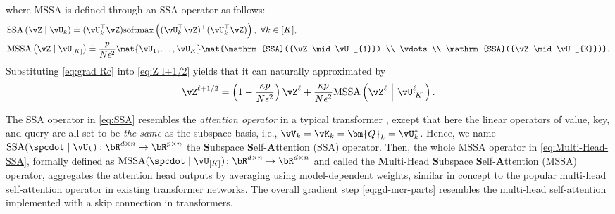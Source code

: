 \documentclass[../../book-main.tex]{subfiles}
\begin{document}
where MSSA is defined through an SSA operator as follows:
\begin{align}
    & \mathrm{SSA}\left(\vZ \mid \vU_{k}\right) 
    \doteq (\vU_{k}^\top \vZ)\mathrm{softmax}\left((\vU_{k}^\top\vZ)^\top(\vU_{k}^\top\vZ)\right), \ \forall k \in [K], \label{eq:SSA} \\
    & \mathrm{MSSA}\left(\vZ \mid \vU_{[K]}\right) 
    \doteq \frac{p}{N\epsilon^2} \mat{\vU_{1}, \dots, \vU_{K}}\mat{\mathrm{SSA}({\vZ \mid \vU_{1}}) \\ \vdots \\ \mathrm{SSA}({\vZ \mid \vU_{K}})}.\label{eq:Multi-Head-SSA}
\end{align}  
Substituting \eqref{eq:grad Rc} into \eqref{eq:Z l+1/2} yields that it can naturally approximated by
\begin{equation}
    \vZ^{\ell + 1/2} = \left(1 - \frac{\kappa p}{N\epsilon^2}\right) \vZ^{\ell} + \frac{\kappa p}{N\epsilon^2} \mathrm{MSSA}\left(\vZ^{\ell}\ \middle|\ \vU_{[K]}^{\ell}\right).  \label{eq:gd-mcr-parts} 
\end{equation}



\begin{remark}
    The SSA operator in \eqref{eq:SSA} resembles the \textit{attention operator} in a typical transformer \citep{vaswani2017attention}, except that here the linear operators of value, key, and query  are all set to be \textit{the same} as the subspace basis, i.e., $\vV_{k} = \vK_{k} = \bm{Q}_{k} = \vU_k^*$. Hence, we name $\mathrm{SSA}({\spcdot\mid\vU_k}): \bR^{d\times n} \rightarrow \bR^{p\times n}$  the \textbf{S}ubspace \textbf{S}elf-\textbf{A}ttention (SSA) operator. Then, the whole MSSA operator in \eqref{eq:Multi-Head-SSA}, formally defined as \(\mathrm{MSSA}({\spcdot \mid \vU_{[K]}}) \colon \bR^{d \times n} \to \bR^{d \times n}\) and called the \textbf{M}ulti-Head \textbf{S}ubspace \textbf{S}elf-\textbf{A}ttention (MSSA) operator, aggregates the attention head outputs by averaging using model-dependent weights, similar in concept to the popular multi-head self-attention operator in existing transformer networks.  The overall gradient step \eqref{eq:gd-mcr-parts} resembles the multi-head self-attention implemented with a skip connection in transformers.  
\end{remark}
\end{document}
